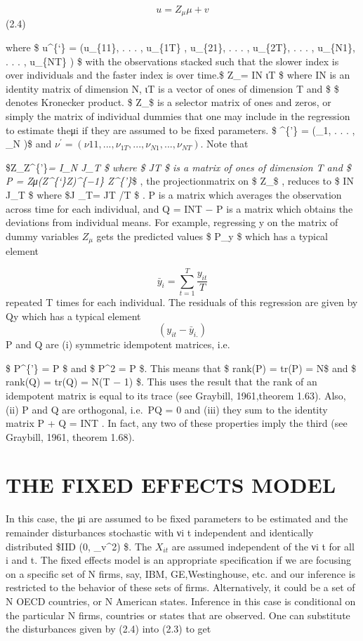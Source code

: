 \documentclass[
]{book}
\begin{document}
\[ u=Z_\mu \mu  + v\]
(2.4)

where \$ u\^{}\{`\} = (u\_\{11\}, . . . , u\_\{1T\} , u\_\{21\}, . . . , u\_\{2T\}, . . . , u\_\{N1\}, . . . , u\_\{NT\} ) \$ with the observations stacked
such that the slower index is over individuals and the faster index is over time.\$ Z\_\mu = IN \otimes ιT \$
where IN is an identity matrix of dimension N, ιT is a vector of ones of dimension T and \$ \otimes \$ denotes Kronecker product. \$ Z\_\mu \$ is a selector matrix of ones and zeros, or simply the matrix of individual dummies that one may include in the regression to estimate theμi if they are assumed to
be fixed parameters. \$ \mu\^{}\{'\} = (\mu\_1, . . . , \mu\_N )\$ and \(ν^{'} = (ν11, . . . , ν_{1T} , . . . , ν_{N1}, . . . , ν_{NT} )\). Note that

\$Z\_\mu Z\^{}\{'\}\emph{\mu = I\_N \otimes J\_T \$
where
\$ JT \$
is a matrix of ones of dimension T and
\$ P = Zμ(Z\^{}\{`\}\emph{\mu Z}\mu)\^{}\{−1\} Z\^{}\{'\}}\mu  \$
, the projectionmatrix on \$ Z\_\mu \$ , reduces to
\$ IN \otimes J\_T \$
where
\$J \_T= JT /T \$
. P is a matrix which averages the observation across time for each individual, and Q = INT − P is a matrix which obtains
the deviations from individual means. For example, regressing y on the matrix of dummy variables
\(Z_μ\) gets the predicted values \$ P\_y \$ which has a typical element

\[ \bar y_i = \sum_{t=1}^T \frac{y_{it}}{T}  \]
repeated T times for each individual. The residuals of this regression are given by Qy which has a typical element
\[ (y_{it} - \bar y _{i.} ) \]
P and Q are (i) symmetric idempotent matrices, i.e.

\$ P\^{}\{'\} = P \$
and
\$ P\^{}2 = P \$.
This means that
\$ rank(P) = tr(P) = N\$
and
\$ rank(Q) = tr(Q) = N(T − 1) \$.
This uses the result that the rank of an idempotent matrix is equal to its trace (see Graybill, 1961,theorem 1.63). Also, (ii) P and Q are orthogonal, i.e.~PQ = 0 and (iii) they sum to the identity matrix P + Q = INT . In fact, any two of these properties imply the third (see Graybill, 1961, theorem 1.68).

\hypertarget{the-fixed-effects-model}{%
\section{THE FIXED EFFECTS MODEL}\label{the-fixed-effects-model}}

In this case, the μi are assumed to be fixed parameters to be estimated and the remainder disturbances stochastic with νi t independent and identically distributed \$IID (0, \sigma\_v\^{}2) \$. The \(X_{it}\) are assumed independent of the νi t for all i and t. The fixed effects model is an appropriate specification if we are focusing on a specific set of N firms, say, IBM, GE,Westinghouse, etc. and our inference is restricted to the behavior of these sets of firms. Alternatively, it could be
a set of N OECD countries, or N American states. Inference in this case is conditional on the particular N firms, countries or states that are observed. One can substitute the disturbances given by (2.4) into (2.3) to get
\end{document}
